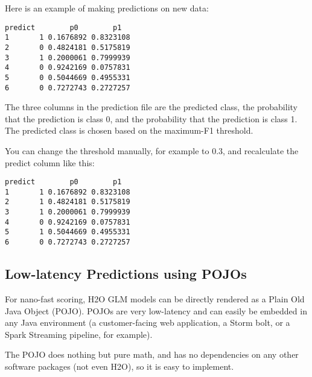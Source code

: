 \waterExampleInR



\newpage
\waterExampleInPython


Here is an example of making predictions on new data:



\begin{lstlisting}[style=output]
  predict        p0        p1
1       1 0.1676892 0.8323108
2       0 0.4824181 0.5175819
3       1 0.2000061 0.7999939
4       0 0.9242169 0.0757831
5       0 0.5044669 0.4955331
6       0 0.7272743 0.2727257
\end{lstlisting}


The three columns in the prediction file are the predicted class, the probability that the prediction is class 0,
and the probability that the prediction is class 1. The predicted class is chosen based on the maximum-F1 threshold.

You can change the threshold manually, for example to 0.3, and recalculate the predict column like this:



\begin{lstlisting}[style=output]
  predict        p0        p1
1       1 0.1676892 0.8323108
2       1 0.4824181 0.5175819
3       1 0.2000061 0.7999939
4       0 0.9242169 0.0757831
5       1 0.5044669 0.4955331
6       0 0.7272743 0.2727257
\end{lstlisting}

\subsection{Low-latency Predictions using POJOs}

For nano-fast scoring, H2O GLM models can be directly rendered as a Plain Old Java Object (POJO).  POJOs are very
low-latency and can easily be embedded in any Java environment (a customer-facing web application, a Storm bolt,
or a Spark Streaming pipeline, for example).

The POJO does nothing but pure math, and has no dependencies on any other software packages (not even H2O),
so it is easy to implement.

